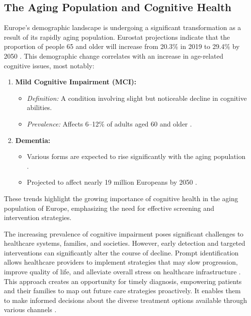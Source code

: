 \subsection{The Aging Population and Cognitive Health}
Europe's demographic landscape is undergoing a significant transformation as a result of its rapidly aging population. Eurostat projections indicate that the proportion of people 65 and older will increase from 20.3\% in 2019 to 29.4\% by 2050 \cite{Eurostat2020}. This demographic change correlates with an increase in age-related cognitive issues, most notably:
\begin{enumerate}
    \item \textbf{Mild Cognitive Impairment (MCI):}
    \begin{itemize}
        \item \textit{Definition:} A condition involving slight but noticeable decline in cognitive abilities.
        \item \textit{Prevalence:} Affects 6--12\% of adults aged 60 and older \cite{Petersen2018}.
    \end{itemize}
    
    \item \textbf{Dementia:}
    \begin{itemize}
        \item Various forms are expected to rise significantly with the aging population \cite{Livingston2020}.
        \item Projected to affect nearly 19 million Europeans by 2050 \cite{AlzheimerEurope2019}.
    \end{itemize}
\end{enumerate}

These trends highlight the growing importance of cognitive health in the aging population of Europe, emphasizing the need for effective screening and intervention strategies.

The increasing prevalence of cognitive impairment poses significant challenges to healthcare systems, families, and societies. However, early detection and targeted interventions can significantly alter the course of decline. Prompt identification allows healthcare providers to implement strategies that may slow progression, improve quality of life, and alleviate overall stress on healthcare infrastructure \cite{Livingston2020}. This approach creates an opportunity for timely diagnosis, empowering patients and their families to map out future care strategies proactively. It enables them to make informed decisions about the diverse treatment options available through various channels \cite{Sperling2011}.

